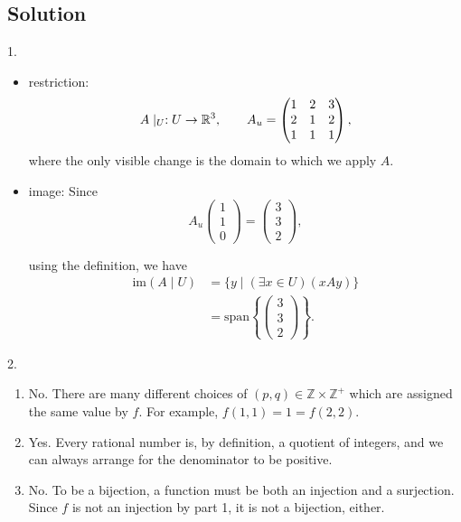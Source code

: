 \documentclass[12pt]{article}
\begin{document}
\subsection{Solution}
1. 
\begin{itemize}
	\item restriction: $$A \mid_U : U \to \mathbb{R}^3, \quad \quad A_u = 
	\begin{pmatrix}
		 1 & 2 &3 \\ 
		 2 & 1 & 2 \\ 
		1 & 1 & 1
	\end{pmatrix},$$
	where the only visible change is the domain to which we apply $A$.
	\item image: Since 
	$$ A_u
	\begin{pmatrix}
		1  \\ 
		1  \\ 
	    0 
    \end{pmatrix}  = 
	\begin{pmatrix}
		3  \\ 
		3  \\ 
    	2 
	\end{pmatrix},
	$$
	
	using the definition, we have
	\begin{equation*}
		\begin{aligned}
			\text{im} (A\mid U) & = \{y \mid (\exists x \in U) (xAy)\} \\
			& = \text{span} \left\{
			\begin{pmatrix}
				3  \\ 
				3  \\ 
				2 
			\end{pmatrix}\right\}.
		\end{aligned}
	\end{equation*}


\end{itemize}
2.
\begin{enumerate}
	\item No. There are many different choices of $(p, q) \in \mathbb{Z} \times \mathbb{Z}^+$ which are assigned the same value by $f$. For example, $f(1, 1) = 1 = f(2, 2)$.
	\item Yes. Every rational number is, by definition, a quotient of integers, and we	can always arrange for the denominator to be positive.
	\item No. To be a bijection, a function must be both an injection and a surjection.	Since $f$ is not an injection by part 1, it is not a bijection, either.
\end{enumerate}
\end{document}
